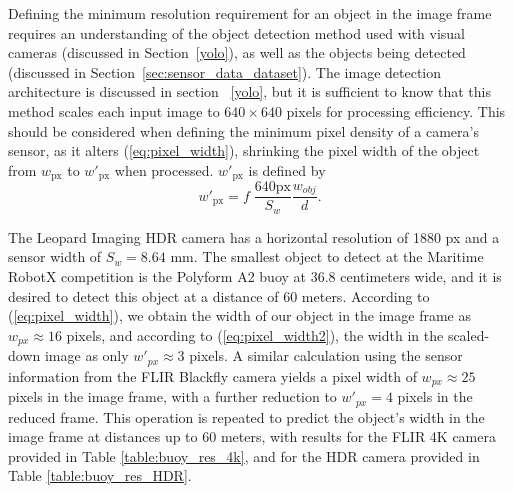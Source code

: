 \documentclass{erauthesis}
\begin{document}
Defining the minimum resolution requirement for an object in the image frame requires an understanding of the object detection method used with visual cameras (discussed in Section~\ref{yolo}), as well as the objects being detected (discussed in Section~\ref{sec:sensor_data_dataset}). 
The image detection architecture is discussed in section ~\ref{yolo}, but it is sufficient to know that this method scales each input image to $640 \times 640$ pixels for processing efficiency.
This should be considered when defining the minimum pixel density of a camera's sensor, as it alters (\ref{eq:pixel_width}), shrinking the pixel width of the object from  $\mathit{w}_{\text{px}}$ to $\mathit{w}'_{\text{px}}$ when processed. $\mathit{w}'_{\text{px}}$ is defined by
\begin{equation}\label{eq:pixel_width2}
\mathit{w}'_{\text{px}} = f \; \frac{640 \text{px}}{S_w}\frac{\mathit{w}_{obj}}{d}.
\end{equation}



The Leopard Imaging \ac{HDR} camera has a horizontal resolution of 1880 px and a sensor width of $S_{w} = 8.64$ mm. The smallest object to detect at the Maritime RobotX competition is the Polyform A2 buoy at $36.8$ centimeters wide, and it is desired to detect this object at a distance of 60 meters. According to (\ref{eq:pixel_width}), we obtain the width of our object in the image frame as $w_{px} \approx 16$ pixels, and according to (\ref{eq:pixel_width2}), the width in the scaled-down image as only  $w'_{px} \approx 3$ pixels.
A similar calculation using the sensor information from the FLIR Blackfly camera yields a pixel width of $w_{px}\approx 25$ pixels in the image frame, with a further reduction to $w'_{px} = 4$  pixels in the reduced frame.
This operation is repeated to predict the object's width in the image frame at distances up to 60 meters, with results for the FLIR 4K camera provided in Table \ref{table:buoy_res_4k}, and for the HDR camera provided in Table \ref{table:buoy_res_HDR}.





\end{document}
